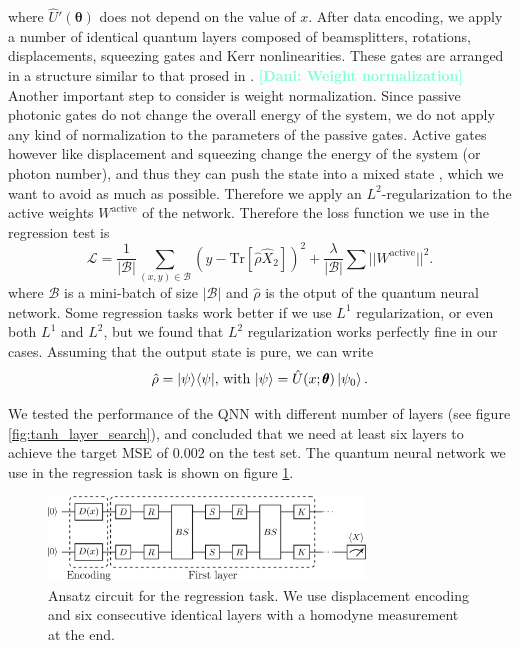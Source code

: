 \documentclass[12pt, a4paper,  nobibnotes]{article}
\newcommand{\op}[1]{\hat{#1}}
\newcommand{\ketbra}[2]{|#1\rangle\langle#2|}
\newcommand{\Tr}[1]{\mathrm{Tr}\left[#1\right]}
\newcommand{\nd}[1]{\textcolor{Aquamarine}{\textbf{[Dani: #1]}}}
\begin{document}
where $\op U'(\pmb\theta)$ does not depend on the value of $x$.
After data encoding, we apply a number of identical quantum layers composed of beamsplitters, 
rotations, displacements, squeezing gates and Kerr nonlinearities. These gates are arranged in 
a structure similar to that prosed in \cite{CVQNNLLoyd}.
\nd{Weight normalization}
Another important step to consider is weight normalization. Since passive photonic gates 
do not change the overall energy of the system, we do not apply any kind of normalization 
to the parameters of the passive gates. Active gates however like displacement and squeezing
change the energy of the system (or photon number), and thus they can push the state 
into a mixed state \cite{CVQNNLLoyd}, which we want to avoid as much as possible.
Therefore we apply an $L^2$-regularization to the active weights $W^{\textrm{active}}$ of the 
network. Therefore the loss function we use in the regression test is
\begin{equation}
    \mathcal L = \frac{1}{|\mathcal B|}\sum\limits_{(x,y)\in\mathcal B} \left(y - \Tr{\op\rho \op X_2} \right)^2 + \frac{\lambda}{|\mathcal B|}\sum||W^{\textrm{active}}||^2.
\end{equation}
where $\mathcal B$ is a mini-batch of size $|\mathcal B|$ and $\op \rho$ is the otput of the quantum neural network.
Some regression tasks work better if we use $L^1$ regularization, or even both $L^1$ and $L^2$,
but we found that $L^2$ regularization works perfectly fine in our cases.
Assuming that the output state is pure, we can write
\begin{equation}
    \op \rho = \ketbra{\psi}{\psi},\, \textrm{with}\, \ket\psi = \op U(x;\pmb\theta)\ket{\psi_0}.
    \label{eq:regression-output}
\end{equation}


We tested the performance of the QNN with different number of layers (see figure \ref{fig:tanh_layer_search}), 
and concluded that we need at least six layers to achieve the target MSE of $0.002$ on the test set.
The quantum neural network we use in the regression task is shown on figure \ref{fig:BasicTwoModeRegressor}.

\begin{figure}[H]
    \centering
    \includegraphics[width=0.75\textwidth]{figures/BasicTwoModeRegressor-circuit.pdf}
    \caption{Ansatz circuit for the regression task. We use displacement encoding and 
    six consecutive identical layers with a homodyne measurement at the end.}
    \label{fig:BasicTwoModeRegressor}
\end{figure}
\end{document}
